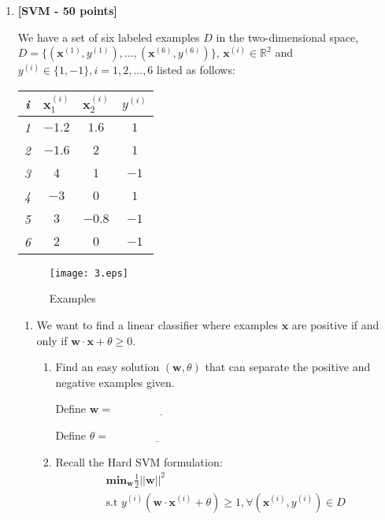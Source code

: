 \begin{enumerate}

\item {\bf [SVM - 50 points]}

\pp
We have a set of six labeled examples $D$ in the two-dimensional space, $D = \{(\mathbf{x}^{(1)}, y^{(1)}),...,(\mathbf{x}^{(6)}, y^{(6)})\}$, $\mathbf{x}^{(i)} \in \mathbb{R}^{2}$ and $y^{(i)} \in \{1, -1\}, i=1,2,...,6$ listed as follows:
  \begin{center}
    \begin{tabular}{|c|c|c|c|}
      \hline
      {\em i}  & $\mathbf{x}_1^{(i)}$  & $\mathbf{x}_2^{(i)}$ & $y^{(i)}$ \\
      \hline
      {\em 1}  & $-1.2$  & $1.6$ & $1$ \\
      \hline
      {\em 2}  & $-1.6$  & $2$ & $1$ \\
      \hline
      {\em 3}  & $4$  & $1$ & $-1$ \\
      \hline
      {\em 4}  & $-3$  & $0$ & $1$ \\
      \hline
      {\em 5}  & $3$  & $-0.8$ & $-1$ \\
      \hline
      {\em 6}  & $2$  & $0$ & $-1$ \\
      \hline
    \end{tabular}
  \end{center}
  \begin{figure}[h!]
        \begin{center}
          \texttt{[image: 3.eps]}
          \caption{Examples}
          \label{fig:1-500}
        \end{center}
      \end{figure}
\begin{enumerate}
\item[(a)][$20$ points]
We want to find a linear classifier where examples $\mathbf{x}$ are positive if and only if $\mathbf{w}\cdot \mathbf{x} + \theta \geq 0$.

\begin{enumerate}
\item[1.][$3$ points] Find an easy solution $(\mathbf{w}, \theta)$ that can separate the positive and negative examples given.

\vspace{.13in}
Define $\mathbf{w}=$ $\underline{\qquad\qquad\qquad\qquad}$

\vspace{.13in}
Define $\theta =$ $\underline{\qquad\qquad\qquad\qquad}$
\vspace{.13in}
\item[2.][$10$ points] Recall the Hard SVM formulation:
\begin{gather}
\textbf{min}_{\mathbf{w}}\frac{1}{2}||\mathbf{w}||^2 \\
\text{s.t  } y^{(i)}(\mathbf{w}\cdot\mathbf{x}^{(i)}+\theta)\geq 1, \forall (\mathbf{x}^{(i)},y^{(i)})\in D
\end{gather}


\end{enumerate}
\end{enumerate}
\end{enumerate}
